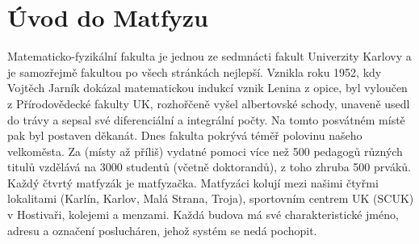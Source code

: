 \section{Úvod do Matfyzu}
Matematicko-fyzikální fakulta je jednou ze sedmnácti fakult Univerzity Karlovy a
je samozřejmě fakultou po všech stránkách nejlepší. Vznikla roku 1952, kdy
Vojtěch Jarník dokázal matematickou indukcí vznik Lenina z opice, byl vyloučen z
Přírodovědecké fakulty UK, rozhořčeně vyšel albertovské schody, unaveně usedl do
trávy a sepsal své diferenciální a integrální počty. Na tomto posvátném místě
pak byl postaven děkanát. Dnes fakulta pokrývá téměř polovinu našeho velkoměsta.
Za (místy až příliš) vydatné pomoci více než 500 pedagogů různých titulů
vzdělává na 3000 studentů (včetně doktorandů), z toho zhruba 500 prváků. Každý
čtvrtý matfyzák je matfyzačka. Matfyzáci kolují mezi našimi čtyřmi lokalitami
(Karlín, Karlov, Malá Strana, Troja), sportovním centrem UK (SCUK) v Hostivaři,
kolejemi a menzami. Každá budova má své charakteristické jméno, adresu a
označení poslucháren, jehož systém se nedá pochopit.